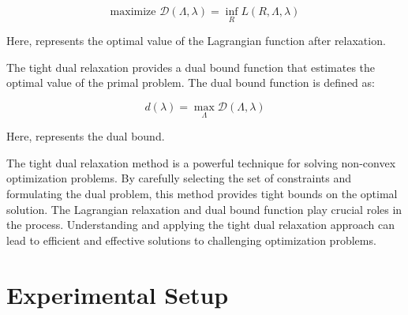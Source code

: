 \begin{equation}
	\text{maximize } \mathcal{D}(\Lambda, \lambda) = \inf_{R} L(R, \Lambda, \lambda)
\end{equation}

Here,  represents the optimal value of the Lagrangian function after relaxation.

The tight dual relaxation provides a dual bound function  that estimates the optimal value of the primal problem. The dual bound function is defined as:

\begin{equation}
	d(\lambda) = \max_{\Lambda} \mathcal{D}(\Lambda, \lambda)
\end{equation}


Here,  represents the dual bound.

The tight dual relaxation method is a powerful technique for solving non-convex optimization problems. By carefully selecting the set of constraints and formulating the dual problem, this method provides tight bounds on the optimal solution. The Lagrangian relaxation and dual bound function play crucial roles in the process. Understanding and applying the tight dual relaxation approach can lead to efficient and effective solutions to challenging optimization problems.




\section{Experimental Setup}\label{sec:2-pose-estimation-experimental-setup}

